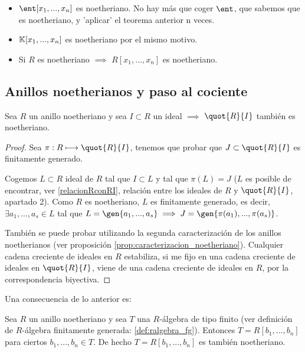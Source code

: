 \begin{example}
	\begin{itemize}
	\item $\ent[x_1,...,x_n]$ es noetheriano. No hay más que coger $\ent$, que sabemos que es noetheriano, y 'aplicar' el teorema anterior n veces.
	\item $\mathbb{K}[x_1,...,x_n]$ es noetheriano por el mismo motivo.
	\item Si $R$ es noetheriano $\implies$ $R[x_1,...,x_n]$ es noetheriano.
	\end{itemize}
\end{example}

\subsection{Anillos noetherianos y paso al cociente}

\begin{prop}
	Sea $R$ un anillo noetheriano y sea $I \subset R$ un ideal $\implies$ $\quot{R}{I}$ también es noetheriano.
\end{prop}
\begin{proof}
	Sea $\pi: R \longmapsto \quot{R}{I}$, tenemos que probar que $J \subset \quot{R}{I}$ es finitamente generado.
	
	Cogemos $L \subset R$ ideal de $R$ tal que $I \subset L$ y tal que $\pi(L)=J$ ($L$ es posible de encontrar, ver \ref{relacionRconRI}, relación entre los ideales de $R$ y $\quot{R}{I}$, apartado 2). Como $R$ es noetheriano, $L$ es finitamente generado, es decir, $\exists a_1,...,a_s \in L$ tal que $L=\gen{a_1,...,a_s} \implies J=\gen{\pi(a_1),...,\pi(a_s)}$.
	
	También se puede probar utilizando la segunda caracterización de los anillos noetherianos (ver proposición \ref{prop:caracterizacion_noetheriano}). Cualquier cadena creciente de ideales en $R$ estabiliza, si me fijo en una cadena creciente de ideales en $\quot{R}{I}$, viene de una cadena creciente de ideales en $R$, por la correspondencia biyectiva.
\end{proof}

Una consecuencia de lo anterior es:

\obs Sea $R$ un anillo noetheriano y sea $T$ una $R$-álgebra de tipo finito (ver definición de $R$-álgebra finitamente generada: \ref{def:ralgebra_fg}). Entonces $T=R[b_1,...,b_n]$ para ciertos $b_1,...,b_n \in T$. De hecho $T=R[b_1,...,b_n]$ es también noetheriano.

